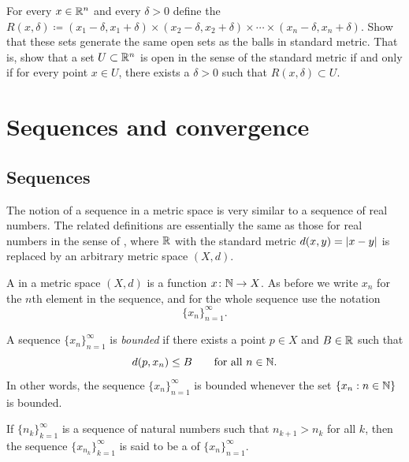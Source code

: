\begin{exercise}
For every $x \in {\mathbb{R}}^n$ and every $\delta > 0$ define the 
$R(x,\delta) \coloneqq
(x_1-\delta,x_1+\delta) \times
(x_2-\delta,x_2+\delta) \times \cdots \times
(x_n-\delta,x_n+\delta)$.  Show that these sets generate the same open
sets as the balls in standard metric.  That is, show that a set $U \subset {\mathbb{R}}^n$
is open in the sense of the standard metric if and only if for every
point $x \in U$, there exists a $\delta > 0$ such that $R(x,\delta) \subset
U$.
\end{exercise}


\sectionnewpage
\section{Sequences and convergence}
\label{sec:metseqs}



\subsection{Sequences}

The notion of a sequence in a metric space is very similar to a sequence of
real numbers.
The related definitions are essentially the same as those for real numbers
in the sense of , where ${\mathbb{R}}$ with
the standard metric $d(x,y)=\lvert {x-y} \rvert$ is replaced
by an arbitrary metric space $(X,d)$.


\begin{defn}
A \emph{} in a metric space $(X,d)$ is a function
$x \colon {\mathbb{N}} \to X$.  As before we write $x_n$ for the $n$th element in
the sequence, and for the whole sequence use the notation
\begin{equation*}
\{ x_n \}_{n=1}^\infty .
\end{equation*}

A sequence $\{ x_n \}_{n=1}^\infty$ is \emph{bounded} if
there exists a point $p \in X$ and $B \in {\mathbb{R}}$ such that
\begin{equation*}
d(p,x_n) \leq B \qquad \text{for all } n \in {\mathbb{N}}.
\end{equation*}
In other words, the sequence $\{x_n\}_{n=1}^\infty$ is bounded whenever
the set $\{ x_n : n \in {\mathbb{N}} \}$
is bounded.

If $\{ n_k \}_{k=1}^\infty$ is a sequence of natural numbers
such that $n_{k+1} > n_k$ for all $k$, then
the sequence $\{ x_{n_k} \}_{k=1}^\infty$
is said to be
a \emph{} of $\{x_n \}_{n=1}^\infty$.
\end{defn}

